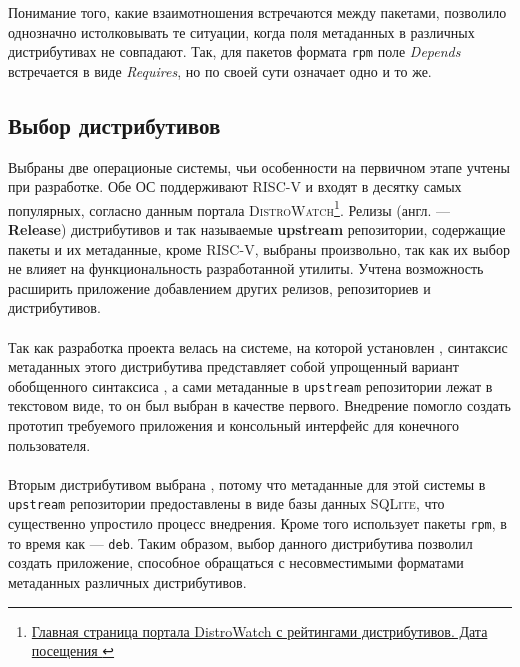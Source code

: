 Понимание того, какие взаимотношения встречаются между пакетами, позволило однозначно истолковывать те ситуации, когда поля метаданных в различных дистрибутивах не совпадают.
Так, для пакетов формата \texttt{rpm} поле \textit{Depends} встречается в виде \textit{Requires}, но по своей сути означает одно и то же.

\subsection{Выбор дистрибутивов}
Выбраны две операционые системы, чьи особенности на первичном этапе учтены при разработке.
Обе ОС поддерживают \textsc{RISC-V} и входят в десятку самых популярных, согласно данным портала \textsc{DistroWatch}\footnote{\href{https://distrowatch.com/}{Главная страница портала DistroWatch с рейтингами дистрибутивов. Дата посещения }}.
Релизы (англ. --- \textbf{Release}) дистрибутивов и так называемые \textbf{upstream} репозитории, содержащие пакеты и их метаданные, кроме \textsc{RISC-V}, выбраны произвольно, так как их выбор не влияет на функциональность разработанной утилиты.
Учтена возможность расширить приложение добавлением других релизов, репозиториев и дистрибутивов.

\paragraph{\ubuntu}
Так как разработка проекта велась на системе, на которой установлен {\ubuntu}, синтаксис метаданных этого дистрибутива представляет собой упрощенный вариант обобщенного синтаксиса {\debian}, а сами метаданные в \texttt{upstream} репозитории лежат в текстовом виде, то он был выбран в качестве первого.
Внедрение {\ubuntu} помогло создать прототип требуемого приложения и консольный интерфейс для конечного пользователя.

\paragraph{\fedora}
Вторым дистрибутивом выбрана {\fedora}, потому что метаданные для этой системы в \texttt{upstream} репозитории предоставлены в виде базы данных \textsc{SQLite}, что существенно упростило процесс внедрения.
Кроме того {\fedora} использует пакеты \texttt{rpm}, в то время как {\ubuntu} --- \texttt{deb}. Таким образом, выбор данного дистрибутива позволил создать приложение, способное обращаться с несовместимыми форматами метаданных различных дистрибутивов.

